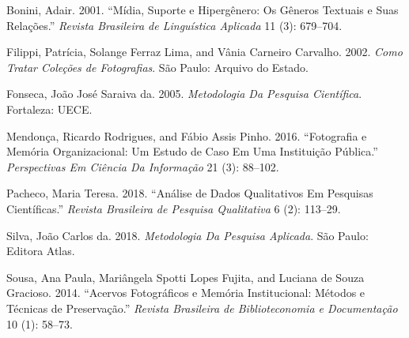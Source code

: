 \documentclass[
]{article}
\newlength{\cslhangindent}
\newenvironment{CSLReferences}[2] %
 {\begin{list}{}{%
  \setlength{\itemindent}{0pt}
  \setlength{\leftmargin}{0pt}
  \setlength{\parsep}{0pt}
  \ifodd #1
   \setlength{\leftmargin}{\cslhangindent}
   \setlength{\itemindent}{-1\cslhangindent}
  \fi
  \setlength{\itemsep}{#2\baselineskip}}}
 {\end{list}}
\begin{document}
\label{refs}
\begin{CSLReferences}{1}{0}
Bonini, Adair. 2001. {``Mídia, Suporte e Hipergênero: Os Gêneros
Textuais e Suas Relações.''} \emph{Revista Brasileira de Linguística
Aplicada} 11 (3): 679--704.

Filippi, Patrícia, Solange Ferraz Lima, and Vânia Carneiro Carvalho.
2002. \emph{Como Tratar Coleções de Fotografias}. São Paulo: Arquivo do
Estado.

Fonseca, João José Saraiva da. 2005. \emph{Metodologia Da Pesquisa
Científica}. Fortaleza: UECE.

Mendonça, Ricardo Rodrigues, and Fábio Assis Pinho. 2016. {``Fotografia
e Memória Organizacional: Um Estudo de Caso Em Uma Instituição
Pública.''} \emph{Perspectivas Em Ciência Da Informação} 21 (3):
88--102.

Pacheco, Maria Teresa. 2018. {``Análise de Dados Qualitativos Em
Pesquisas Científicas.''} \emph{Revista Brasileira de Pesquisa
Qualitativa} 6 (2): 113--29.

Silva, João Carlos da. 2018. \emph{Metodologia Da Pesquisa Aplicada}.
São Paulo: Editora Atlas.

Sousa, Ana Paula, Mariângela Spotti Lopes Fujita, and Luciana de Souza
Gracioso. 2014. {``Acervos Fotográficos e Memória Institucional: Métodos
e Técnicas de Preservação.''} \emph{Revista Brasileira de
Biblioteconomia e Documentação} 10 (1): 58--73.

\end{CSLReferences}
\end{document}
